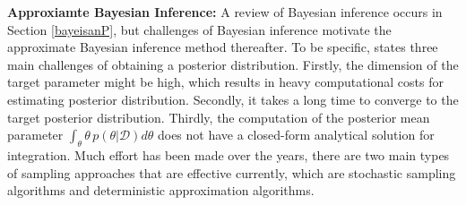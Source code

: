 \noindent \textbf{Approxiamte Bayesian Inference:}
A review of Bayesian inference occurs in Section \ref{bayeisanP}, but challenges of Bayesian inference motivate the approximate Bayesian inference method thereafter. To be specific, \cite{bishop_2006} states three main challenges of obtaining a posterior distribution. Firstly, the dimension of the target parameter might be high, which results in heavy computational costs for estimating posterior distribution. Secondly, it takes a long time to converge to the target posterior distribution. Thirdly, the computation of the posterior mean parameter $\int_{\theta} \theta \, p(\theta|\mathcal{D}) d\theta$ 
does not have a closed-form analytical solution for integration. Much effort has been made over the years, there are two main types of sampling approaches that are effective currently, which are stochastic sampling algorithms and deterministic approximation algorithms. 

